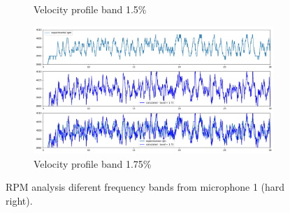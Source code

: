\documentclass[10pt,fleqn,a4paper,twoside]{article}
\begin{document}
\begin{figure}[H]
\begin{subfigure}{0.4\textwidth}
        \caption{Velocity profile band 1.5\%}
        \label{fig:sixth}
    \end{subfigure}
    \centering
    \hfill
    \begin{subfigure}{0.4\textwidth}
        \includegraphics[width=\textwidth]{Figures/rpm_analysis_mic0_band_1.75.png}
        \caption{Velocity profile band 1.75\%}
        \label{fig:seventh}
    \end{subfigure}

            
    \caption{RPM analysis diferent frequency bands from microphone 1 (hard right).}
    \label{fig:figures}
    \end{figure}

    
\end{document}
